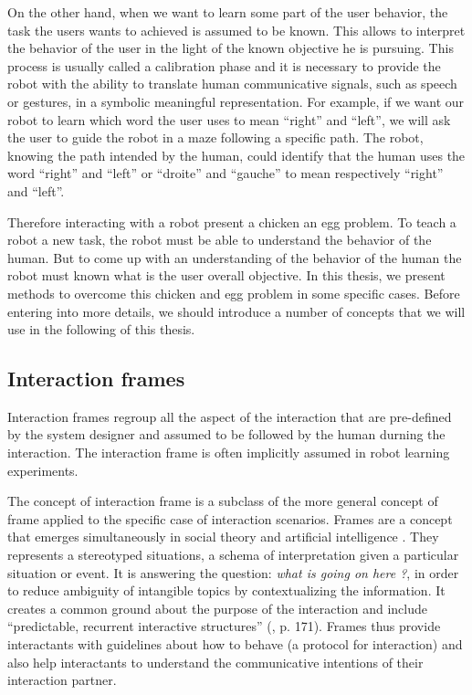 On the other hand, when we want to learn some part of the user behavior, the task the users wants to achieved is assumed to be known. This allows to interpret the behavior of the user in the light of the known objective he is pursuing. This process is usually called a calibration phase and it is necessary to provide the robot with the ability to translate human communicative signals, such as speech or gestures, in a symbolic meaningful representation. For example, if we want our robot to learn which word the user uses to mean ``right'' and ``left'', we will ask the user to guide the robot in a maze following a specific path. The robot, knowing the path intended by the human, could identify that the human uses the word ``right'' and ``left'' or ``droite'' and ``gauche'' to mean respectively ``right'' and ``left''.

Therefore interacting with a robot present a chicken an egg problem. To teach a robot a new task, the robot must be able to understand the behavior of the human. But to come up with an understanding of the behavior of the human the robot must known what is the user overall objective. In this thesis, we present methods to overcome this chicken and egg problem in some specific cases. Before entering into more details, we should introduce a number of concepts that we will use in the following of this thesis.

\subsection{Interaction frames}

Interaction frames regroup all the aspect of the interaction that are pre-defined by the system designer and assumed to be followed by the human durning the interaction. The interaction frame is often implicitly assumed in robot learning experiments. 

The concept of interaction frame is a subclass of the more general concept of frame applied to the specific case of interaction scenarios. Frames are a concept that emerges simultaneously in social theory \cite{goffman1974frame} and artificial intelligence \cite{minsky1974framework}. They represents a stereotyped situations, a schema of interpretation given a particular situation or event. It is answering the question: \emph{what is going on here ?}, in order to reduce ambiguity of intangible topics by contextualizing the information. It creates a common ground about the purpose of the interaction \cite{tomasello2009cultural,rohlfing2013learning} and include ``predictable, recurrent interactive structures'' (\cite{ninio1996pragmatic}, p. 171). Frames thus provide interactants with guidelines about how to behave (a protocol for interaction) and also help interactants to understand the communicative intentions of their interaction partner.

